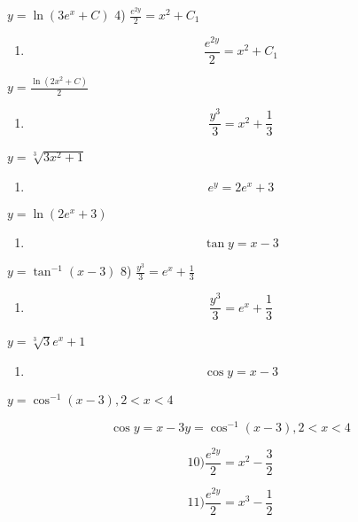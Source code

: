 \documentclass[
]{article}
\providecommand{\tightlist}{%
  \setlength{\itemsep}{0pt}\setlength{\parskip}{0pt}}
\begin{document}
\(y = \ln (3e^x + C)\) 4) \(\frac{e^{2y}}{2} = x^2 + C_1\)

\begin{enumerate}
\def\labelenumi{\arabic{enumi})}
\setcounter{enumi}{3}
\tightlist
\item
  \[\frac{e^{2y}}{2} = x^2 + C_1\]
\end{enumerate}

\(y = \frac{\ln(2x^2 + C)}{2}\)

\begin{enumerate}
\def\labelenumi{\arabic{enumi})}
\setcounter{enumi}{4}
\tightlist
\item
  \[\frac{y^3}{3} = x^2 + \frac{1}{3}\]
\end{enumerate}

\(y = \sqrt[3]{3x^2 + 1}\)

\begin{enumerate}
\def\labelenumi{\arabic{enumi})}
\setcounter{enumi}{5}
\tightlist
\item
  \[e^y = 2e^x + 3\]
\end{enumerate}

\(y = \ln (2e^x + 3)\)

\begin{enumerate}
\def\labelenumi{\arabic{enumi})}
\setcounter{enumi}{6}
\tightlist
\item
  \[\tan y = x - 3\]
\end{enumerate}

\(y = \tan^{-1}(x - 3)\) 8) \(\frac{y^3}{3} = e^x + \frac{1}{3}\)

\begin{enumerate}
\def\labelenumi{\arabic{enumi})}
\setcounter{enumi}{7}
\tightlist
\item
  \[\frac{y^3}{3} = e^x + \frac{1}{3}\]
\end{enumerate}

\(y = \sqrt[3]{3}e^x + 1\)

\begin{enumerate}
\def\labelenumi{\arabic{enumi})}
\setcounter{enumi}{8}
\tightlist
\item
  \[\cos y = x - 3\]
\end{enumerate}

\(y = \cos^{-1}(x - 3), 2 < x < 4\)

\[\cos y = x - 3 y = \cos^{-1}(x - 3), 2 < x < 4\]

\[10) \frac{e^{2y}}{2} = x^2 - \frac{3}{2}\]

\[11) \frac{e^{2y}}{2} = x^3 - \frac{1}{2}\]
\end{document}
